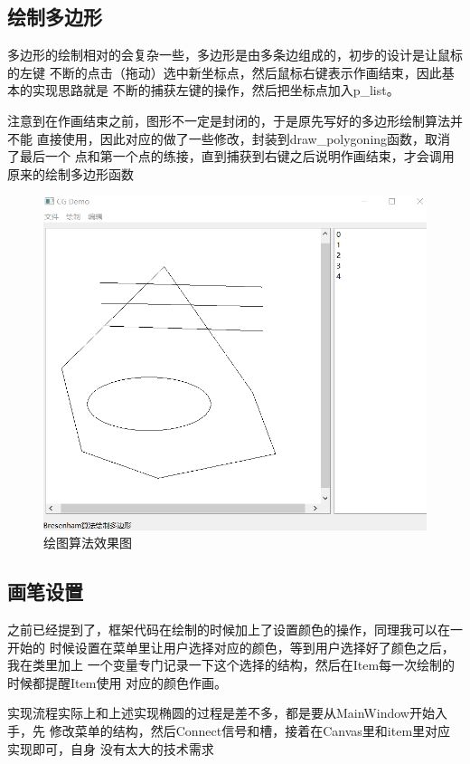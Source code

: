 \documentclass[a4paper,UTF8]{article}
\theoremstyle{definition}
\begin{document}
\subsection{绘制多边形}
多边形的绘制相对的会复杂一些，多边形是由多条边组成的，初步的设计是让鼠标的左键
不断的点击（拖动）选中新坐标点，然后鼠标右键表示作画结束，因此基本的实现思路就是
不断的捕获左键的操作，然后把坐标点加入p\_list。

注意到在作画结束之前，图形不一定是封闭的，于是原先写好的多边形绘制算法并不能
直接使用，因此对应的做了一些修改，封装到draw\_polygoning函数，取消了最后一个
点和第一个点的练接，直到捕获到右键之后说明作画结束，才会调用原来的绘制多边形函数

\begin{figure}[h]
	\centering
	\includegraphics[scale=0.4]{figure/draw.png}
	\caption{绘图算法效果图}
	\label{fig:DrawGUI}
\end{figure}

\subsection{画笔设置}
之前已经提到了，框架代码在绘制的时候加上了设置颜色的操作，同理我可以在一开始的
时候设置在菜单里让用户选择对应的颜色，等到用户选择好了颜色之后，我在类里加上
一个变量专门记录一下这个选择的结构，然后在Item每一次绘制的时候都提醒Item使用
对应的颜色作画。

实现流程实际上和上述实现椭圆的过程是差不多，都是要从MainWindow开始入手，先
修改菜单的结构，然后Connect信号和槽，接着在Canvas里和item里对应实现即可，自身
没有太大的技术需求
\end{document}
